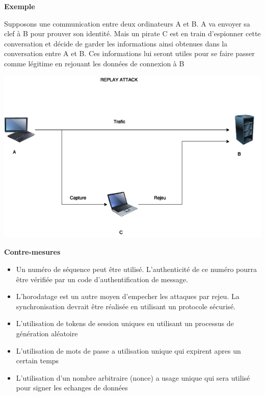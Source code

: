 \bigskip

\begin{flushleft}
\textbf{Exemple}
\end{flushleft}

\smallskip

\begin{flushleft}
Supposons une communication entre deux ordinateurs A et B. A va envoyer sa clef à B pour prouver son identité. Mais un pirate C est en train d'espionner cette conversation et décide de garder les informations ainsi obtenues dans la conversation entre A et B. Ces informations lui seront utiles pour se faire passer comme légitime en rejouant les données de connexion à B
\end{flushleft}

\smallskip

\begin{center}
\includegraphics[scale=0.3]{Network/assets/rejeu.png}
\end{center}

\bigskip


\begin{flushleft}
\textbf{Contre-mesures}
\end{flushleft}

\smallskip

\begin{itemize}
\item Un numéro de séquence peut être utilisé. L'authenticité de ce numéro pourra être vérifiée par un code d'authentification de message.
\item L'horodatage est un autre moyen d'empecher les attaques par rejeu. La synchronisation devrait être réalisée en utilisant un protocole sécurisé.
\item L'utilisation de tokens de session uniques en utilisant un processus de génération aléatoire
\item L'utilisation de mots de passe a utilisation unique qui expirent apres un certain temps
\item L'utilisation d'un nombre arbitraire (nonce) a usage unique qui sera utilisé pour signer les echanges de données
\end{itemize}

